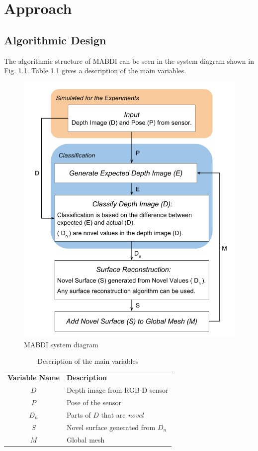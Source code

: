 \chapter{Approach}	\label{chapter:approach}

\section{Algorithmic Design}
\label{section:algorithmic_design}

The algorithmic structure of MABDI can be seen in the system diagram shown in
Fig. \ref{fig:system}. Table \ref{tab:var} gives a description of the main
variables.

\begin{figure}[h!]%
\centering
  \includegraphics[width=.70\textwidth]{figures/diagram_system.png}
  \caption{MABDI system diagram}
  \label{fig:system}
\end{figure}

\begin{table}[h]
  \caption{Description of the main variables}
  \label{tab:var}
  \begin{center}
    \begin{tabular}{c|l}
    \cellcolor{white} {\bf Variable Name} & {\bf Description} \\ %
    \rowcolor{LightGray}
    $D$ & Depth image from RGB-D sensor \\
    $P$ & Pose of the sensor \\
    \rowcolor{LightGray}
    $D_n$ & Parts of $D$ that are \emph{novel} \\
    $S$ & Novel surface generated from $D_n$ \\
    \rowcolor{LightGray}
    $M$ & Global mesh \\
    \end{tabular}
  \end{center}
\end{table}

